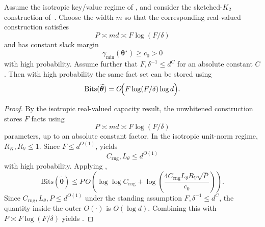 \begin{corollary}
\label{cor:bit_complexity_isotropic}
Assume the isotropic key/value regime of
, and consider the sketched-$K_{2}$ construction of~.
Choose the width $m$ so that the corresponding real-valued construction
satisfies
\[
P\asymp md \asymp F\log(F/\delta)
\]
and has constant slack margin
\[
\gamma_{\min}(\boldsymbol{\theta}^\star)\ge c_{0}>0
\]
with high probability.
Assume further that $F,\delta^{-1}\le d^C$ for an absolute constant $C$.
Then with high probability the same fact set can be stored using
\begin{equation}
\mathrm{Bits}(\widetilde{\boldsymbol{\theta}})
=
O\!\Bigl(
F\log(F/\delta)\log d
\Bigr).
\label{eq:bit_complexity_isotropic_bits}
\end{equation}
\end{corollary}

\begin{proof}
By the isotropic real-valued capacity result, the unwhitened construction stores
$F$ facts using
\[
P\asymp md\asymp F\log(F/\delta)
\]
parameters, up to an absolute constant factor.
In the isotropic unit-norm regime, $R_{K},R_{V}\le 1$.
Since $F \leq d^{O(1)}$,  yields
\[
C_{\mathrm{rng}},L_\theta \le d^{O(1)}
\]
with high probability.
Applying ,
\[
\mathrm{Bits}(\widetilde{\boldsymbol{\theta}})
\le
P\,
O\!\left(
\log\log C_{\mathrm{rng}}
+
\log\!\left(
\frac{4C_{\mathrm{rng}}L_\theta R_{V}\sqrt{P}}{c_0}
\right)
\right).
\]
Since $C_{\mathrm{rng}},L_\theta,P\le d^{O(1)}$ under the standing assumption
$F,\delta^{-1}\le d^C$, the quantity inside the outer \(O(\cdot)\) is \(O(\log d)\).
Combining this with $P\asymp F\log(F/\delta)$ yields
.
\end{proof}

